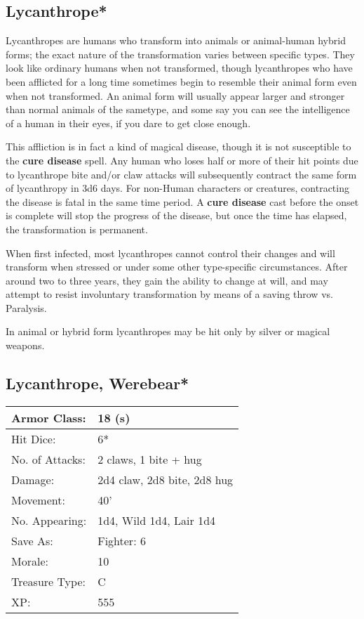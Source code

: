 \documentclass[a4paper,twoside,openany,10pt]{book}
\begin{document}
\begin{multicols}{2}
\subsection*{Lycanthrope*}\label{lycanthrope}

Lycanthropes are humans who transform into animals or animal-human hybrid forms; the exact nature of the transformation varies between specific types. They look like ordinary humans when not transformed, though lycanthropes who have been afflicted for a long time sometimes begin to resemble their animal form even when not transformed. An animal form will usually appear larger and stronger than normal animals of the sametype, and some say you can see the intelligence of a human in their  eyes, if you dare to get close enough.

This affliction is in fact a kind of magical disease, though it is not susceptible to the \textbf{cure disease} spell. Any human who loses half or more of their hit points due to lycanthrope bite and/or claw attacks will subsequently contract the same form of lycanthropy in 3d6 days. For non-Human characters or creatures, contracting the disease is fatal in the same time period. A \textbf{cure disease} cast before the onset is complete will stop the progress of the disease, but once the time has elapsed, the transformation is permanent.

When first infected, most lycanthropes cannot control their changes and will transform when stressed or under some other type-specific circumstances. After around two to three years, they gain the ability to change at will, and may attempt to resist involuntary transformation by means of a saving throw vs. Paralysis.

In animal or hybrid form lycanthropes may be hit only by silver or magical weapons. 

\subsection*{Lycanthrope, Werebear*}\label{lycanthrope-werebear}

\begin{tabularx}{0.50\textwidth}{@{}lX@{}}
Armor Class: & 18 (s) \\\hline
Hit Dice: & 6*  \\\hline
No. of Attacks: & 2 claws, 1 bite + hug \\\hline
Damage: & 2d4 claw, 2d8 bite, 2d8 hug \\\hline
Movement: & 40' \\\hline
No. Appearing: & 1d4, Wild 1d4, Lair 1d4 \\\hline
Save As: & Fighter: 6 \\\hline
Morale: & 10 \\\hline
Treasure Type: & C \\\hline
XP: & 555 \\\hline
\end{tabularx}\medskip


\end{multicols}
\end{document}
